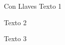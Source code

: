 \documentclass{report}
\begin{document}
\begin{estilodedicatoria}{Con Llaves}
Texto 1
\end{estilodedicatoria}

\begin{estilodedicatoria}
Texto 2
\end{estilodedicatoria}

\begin{estilodedicatoria}
Texto 3
\end{estilodedicatoria}
\end{document}
